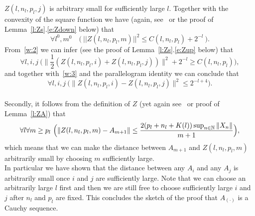 $Z(l,n_l,p_l,j)$ is arbitrary small for sufficiently large $l$. Together with the convexity of the 
square function we have (again, see~\cite{Wittmann90} or the proof of Lemma~\ref{l:Zs}.\eqref{e:Zdown} below) that
\[ \forall l^0,m^0\quad 
\big(\ ||Z(l,n_l,p_l,m)||^2\leq C(l, n_l, p_l) + 2^{-l}\ \big).
\tag{W3}\label{w:3}\]
From~\eqref{w:2} we can infer (see the proof of Lemma~\ref{l:Zs}.\eqref{e:Zup} below) that
\[
\forall l,i,j\ \Big(\big\|\frac{1}{2}(Z(l,n_l,p_l,i)+Z(l,n_l,p_l,j))\big\|^2 + 2^{-l} \geq C(l, n_l, p_l)\Big),
\]
and together with~\eqref{w:3} and the parallelogram identity we can conclude that
\[
\forall l,i,j\ \Big(\big\|Z(l,n_l,p_l,i)-Z(l,n_l,p_l,j)\big\|^2 \leq  2^{-l+4}\Big).
\]\\
Secondly, it follows from the definition of $Z$ (yet again see~\cite{Wittmann90} or  
proof of Lemma~\ref{l:ZA}) that 
 \begin{align*} \forall l\forall m\geq p_l\ \Big( \|Z(l,n_l,p_l,m)-A_{m+1}\|\leq \frac{
 2(p_l+n_l+K(l))\sup_{n\in\mathbb{N}}\|X_n\|}{m+1} \Big),\end{align*}
which means that we can make the distance between $A_{m+1}$ and $Z(l,n_l,p_l,m)$ arbitrarily small by
choosing $m$ sufficiently large.\\
In particular we have shown that the distance between any $A_i$ and any $A_j$ is arbitrarily small 
once $i$ and $j$ are sufficiently large. Note that we can choose an arbitrarily large $l$ first and then we 
are still free to choose sufficiently large $i$ and $j$ after $n_l$ and $p_l$ are fixed.
This concludes the sketch of the proof that $A_{(\cdot)}$ is a Cauchy sequence.\\
